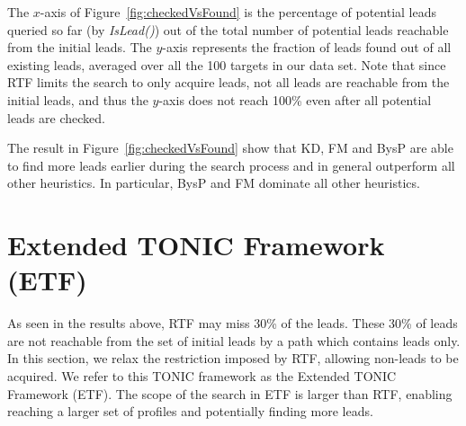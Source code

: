 \documentclass[journal]{IEEEtran}
\newcommand{\islead}[1]{{\em IsLead(#1)}}
\newcommand{\acquire}[1]{{\em Acquire(#1)}}
\begin{document}
The $x$-axis of Figure~\ref{fig:checkedVsFound} is the  percentage of potential leads queried so far (by \islead{}) out of the total number of potential leads reachable from the initial leads. The $y$-axis represents the fraction of leads found out of all existing leads, averaged over all the 100 targets in our data set. Note that since RTF limits the search to only acquire leads, not all leads are reachable from the initial leads, and thus the $y$-axis does not reach 100\% even after all potential leads are checked. 



The result in Figure~\ref{fig:checkedVsFound} show that KD, FM and BysP are able to find more leads earlier during the search process and in general outperform all other heuristics. In particular, BysP and FM dominate all other heuristics. %


\section{Extended TONIC Framework (ETF)}
\label{sec:etf}



As seen in the results above, RTF may miss 30\% of the leads. These 30\% of leads are not reachable from the set of initial leads by a path which contains leads only. In this section, we relax the restriction imposed by RTF, allowing non-leads to be acquired. We refer to this TONIC framework as the Extended TONIC Framework (ETF). The scope of the search in ETF is larger than RTF, enabling reaching a larger set of profiles and potentially finding more leads. %
\end{document}
